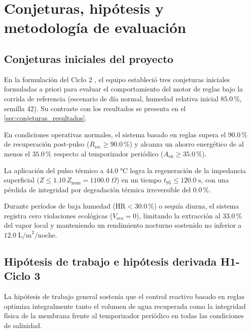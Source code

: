 \chapter{Conjeturas, hip\'otesis y metodolog\'ia de evaluaci\'on}
\label{cap:metodologia}

\section{Conjeturas iniciales del proyecto}
\label{sec:conjeturas}
En la formulaci\'on del Ciclo 2 \parencite[doc.~01, \S\S~2.3 y 2.4]{axioma2026engine}, el equipo estableci\'o tres conjeturas iniciales formuladas a priori para evaluar el comportamiento del motor de reglas bajo la corrida de referencia (escenario de d\'ia normal, humedad relativa inicial $85.0\,\%$, semilla 42). Su contraste con los resultados se presenta en el \cref{sec:conjeturas_resultados}.
\begin{description}[leftmargin=*]
  \item[\textbf{Conjetura 1 (Eficiencia y energ\'ia):}] En condiciones operativas normales, el sistema basado en reglas supera el $90.0\,\%$ de recuperaci\'on post-pulso ($R_{\text{rec}} \ge 90.0\,\%$) y alcanza un ahorro energ\'etico de al menos el $35.0\,\%$ respecto al temporizador peri\'odico ($A_{\text{en}} \ge 35.0\,\%$).
  \item[\textbf{Conjetura 2 (Cin\'etica y seguridad t\'ermica):}] La aplicaci\'on del pulso t\'ermico a $44.0\;\si{\celsius}$ logra la regeneraci\'on de la impedancia superficial ($Z \le 1.10\,Z_{\text{nom}} = 1100.0\;\Omega$) en un tiempo $t_{95} \le 120.0\;\text{s}$, con una p\'erdida de integridad por degradaci\'on t\'ermica irreversible del $0.0\,\%$.
  \item[\textbf{Conjetura 3 (Sostenibilidad y rendimiento ecol\'ogico):}] Durante per\'iodos de baja humedad ($\text{HR} < 30.0\,\%$) o sequ\'ia diurna, el sistema registra cero violaciones ecol\'ogicas ($V_{\text{eco}} = 0$), limitando la extracci\'on al $33.0\,\%$ del vapor local y manteniendo un rendimiento nocturno sostenido no inferior a $12.0\;\text{L/m}^2\text{/noche}$.
\end{description}

\section{Hip\'otesis de trabajo e hip\'otesis derivada H1-Ciclo 3}
\label{sec:hipotesis}
La hip\'otesis de trabajo general sosten\'ia que el control reactivo basado en reglas optimiza integralmente tanto el volumen de agua recuperada como la integridad f\'isica de la membrana frente al temporizador peri\'odico en todas las condiciones de salinidad.

